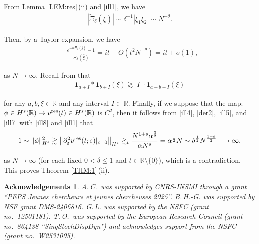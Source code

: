 \documentclass[letterpaper, 11pt,  reqno]{amsart}
\newcommand{\1}{\hspace{0.5mm}\textup{I}\hspace{0.5mm}}
\newcommand{\noi}{\noindent}
\newcommand{\R}{\mathbb{R}}
\newcommand{\high}{\textup{res}}
\newcommand{\al}{\alpha}
\newcommand{\dl}{\delta}
\newcommand{\eps}{\varepsilon}
\newcommand{\wt}{\widetilde}
\newcommand{\dd}{\partial}
\newcommand{\ta}{\theta}
\newcommand{\ges}{\gtrsim}
\newcommand{\ind}{\mathbf 1}
\newcommand{\too}{\longrightarrow}
\newtheorem*{ackno}{Acknowledgements}
\numberwithin{equation}{section}
\numberwithin{theorem}{section}
\begin{document}
From
Lemma \ref{LEM:res}\,(ii) and \eqref{ill1}, we have 
\begin{align*}
|\wt \Xi_\dl(\bar \xi)|\sim \dl^{-1} |\xi_1 \xi_2|
\sim N^{-\ta}.
\end{align*}

\noi
Then, by a Taylor expansion, we have
\begin{align}
-  \frac{e^{- i t \wt \Xi_\dl(\bar \xi)} - 1}{\wt \Xi_\dl(\bar \xi)}
 = it + O(t^2 N^{-\ta})
= it + o(1),  
 \label{ill7}
\end{align}

\noi
as $N \to \infty$.
Recall from 
\cite[Lemma 3.5]{OhFE}
that 
\begin{align}
\ind_{a + I}* \ind_{b + I} (\xi)\ges |I| \cdot \ind_{a+b+I}(\xi)
\label{ill8}
\end{align}
		
\noi
for any $a, b, \xi \in \R$ and 
any interval $I \subset \R$.
Finally, if we suppose that the  map: $\phi \in H^s(\R)\mapsto
v^\high (t) \in H^s(\R)$ is $C^2$, 
then it follows
 from \eqref{ill4}, \eqref{der2}, \eqref{ill5}, 
and \eqref{ill7} with \eqref{ill8} and \eqref{ill1} that
\begin{align*}
1\sim \|\phi\|_{H^s}^2 \ges
\big\|\dd_\eps^2 v^\high(t; \eps)|_{\eps = 0} \big\|_{H^s}
\ges_t \frac{N^{1+s} \al^\frac 32} {\al N^s}
= \al^{\frac 12} N
\sim \dl^{\frac 12} N^{\frac {1-\ta} 2}
\too \infty, 
\end{align*}

\noi
as $N \to \infty$ (for each fixed $0 < \dl \le 1$
and $t \in \R\setminus\{0\}$),
which is a contradiction.
This proves 
Theorem \ref{THM:1}\,(ii).




	












\begin{ackno}\rm
A.\,C.~was supported by  CNRS-INSMI through a grant ``PEPS Jeunes chercheurs et jeunes chercheuses 2025''.
B.\,H.-G. was supported by NSF grant DMS-2406816.
G.\,L. was supported by the NSFC (grant no.~12501181).
T.\,O.~was supported by the European Research Council (grant no.~864138 ``SingStochDispDyn")
and
acknowledges support from  
the NSFC (grant no.~W2531005).

\end{ackno}
\end{document}
